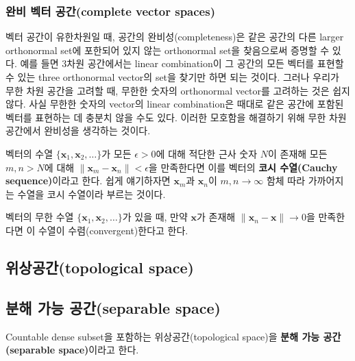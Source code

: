 \documentclass[b5paper,]{scrbook}
\theoremstyle{plain}
\theoremstyle{definition}
\numberwithin{equation}{section}
\let\BeginKnitrBlock\begin \let\EndKnitrBlock\end
\begin{document}
\subsubsection{완비 벡터 공간(complete vector
spaces)}\label{--complete-vector-spaces}

벡터 공간이 유한차원일 때, 공간의 완비성(completeness)은 같은 공간의
다른 larger orthonormal set에 포한되어 있지 않는 orthonormal set을
찾음으로써 증명할 수 있다. 예를 들면 3차원 공간에서는 linear
combination이 그 공간의 모든 벡터를 표현할 수 있는 three orthonormal
vector의 set을 찾기만 하면 되는 것이다. 그러나 우리가 무한 차원 공간을
고려할 때, 무한한 숫자의 orthonormal vector를 고려하는 것은 쉽지 않다.
사실 무한한 숫자의 vector의 linear combination은 때대로 같은 공간에
포함된 벡터를 표현하는 데 충분치 않을 수도 있다. 이러한 모호함을
해결하기 위해 무한 차원 공간에서 완비성을 생각하는 것이다.

\BeginKnitrBlock{definition}[벡터의 Cauchy sequence]
\protect\hypertarget{def:unnamed-chunk-17}{}{\label{def:unnamed-chunk-17}
{} }벡터의 수열
\(\{ \mathbf{x}_{1},\mathbf{x}_{2},\ldots \}\)가 모든 \(\epsilon >0\)에
대해 적단한 근사 숫자 \(N\)이 존재해 모든 \(m,n > N\)에 대해
\(\| \mathbf{x}_{m} -\mathbf{x}_{n} \| < \epsilon\)을 만족한다면 이를
벡터의 \textbf{코시 수열(Cauchy sequence)}이라고 한다. 쉽게 얘기하자면
\(\mathbf{x}_{m}\)과 \(\mathbf{x}_{n}\)이 \(m,n \rightarrow \infty\)
함체 따라 가까어지는 수열을 코시 수열이라 부르는 것이다.
\EndKnitrBlock{definition}

\BeginKnitrBlock{definition}[코시 수열의 수렴]
\protect\hypertarget{def:unnamed-chunk-18}{}{\label{def:unnamed-chunk-18}
{} }벡터의 무한 수열
\(\{\mathbf{x}_{1},\mathbf{x}_{2}, \ldots \}\)가 있을 때, 만약
\(\mathbf{x}\)가 존재해
\(\| \mathbf{x}_{n} -\mathbf{x}\|\rightarrow 0\)을 만족한다면 이 수열이
수렴(convergent)한다고 한다.
\EndKnitrBlock{definition}

\subsection{위상공간(topological space)}\label{topological-space}

\subsection{분해 가능 공간(separable space)}\label{--separable-space}

Countable dense subset을 포함하는 위상공간(topological space)을
\textbf{분해 가능 공간(separable space)}이라고 한다.
\end{document}
